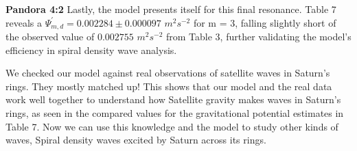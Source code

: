 \documentclass{article}
\begin{document}
\textbf{Pandora 4:2}
Lastly, the model presents itself for this final resonance. Table 7 reveals a $\Psi_{m,d}^{'} = 0.002284 \pm 0.000097$ $m^{2}s^{-2}$ for m = 3, falling slightly short of the observed value of $0.002755$ $m^{2}s^{-2}$ from Table 3, further validating the model's efficiency in spiral density wave analysis.

We checked our model against real observations of satellite waves in Saturn's rings. They mostly matched up! This shows that our model and the real data work well together to understand how Satellite gravity makes waves in Saturn's rings, as seen in the compared values for the gravitational potential estimates in Table 7. Now we can use this knowledge and the model to study other kinds of waves, Spiral density waves excited by Saturn across its rings.

\begin{table}
\centering
{}
\caption{Estimates of Gravitational potential from theoretical model for spiral density waves excited by Saturn's Satellite resonances.}
\end{table}

\end{document}
